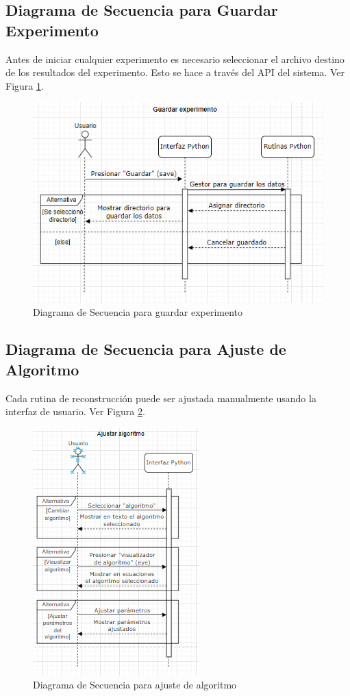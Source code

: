 \documentclass[12pt,twoside,letter]{ol-softwaremanual}
\begin{document}
\subsection{Diagrama de Secuencia para Guardar Experimento}

Antes de iniciar cualquier experimento es necesario seleccionar el archivo destino de los resultados del experimento. Esto se hace a través del API del sistema. Ver Figura \ref{fig:screenshot002}.

\begin{figure}
	\centering
	\includegraphics[width=0.7\linewidth]{figures/screenshot002}
	\caption{Diagrama de Secuencia para guardar experimento}
	\label{fig:screenshot002}
\end{figure}

\subsection{Diagrama de Secuencia para Ajuste de Algoritmo}

Cada rutina de reconstrucción puede ser ajustada manualmente usando la interfaz de usuario. Ver Figura \ref{fig:screenshot005}.

\begin{figure}
	\centering
	\includegraphics[width=0.4\linewidth]{figures/screenshot005}
	\caption{Diagrama de Secuencia para ajuste de algoritmo}
	\label{fig:screenshot005}
\end{figure}
\end{document}
